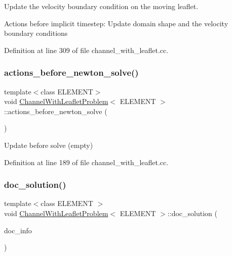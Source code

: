 Update the velocity boundary condition on the moving leaflet. 

Actions before implicit timestep\+: Update domain shape and the velocity boundary conditions 

Definition at line 309 of file channel\+\_\+with\+\_\+leaflet.\+cc.

\mbox{\label{classChannelWithLeafletProblem_a5721dfad66d13a1ae60adce7801dcb12}} 
\subsubsection{\texorpdfstring{actions\+\_\+before\+\_\+newton\+\_\+solve()}{actions\_before\_newton\_solve()}}
{\footnotesize\ttfamily template$<$class E\+L\+E\+M\+E\+NT$>$ \\
void \hyperlink{classChannelWithLeafletProblem}{Channel\+With\+Leaflet\+Problem}$<$ E\+L\+E\+M\+E\+NT $>$\+::actions\+\_\+before\+\_\+newton\+\_\+solve (\begin{DoxyParamCaption}{ }\end{DoxyParamCaption})\hspace{0.3cm}{\ttfamily [inline]}}



Update before solve (empty) 



Definition at line 189 of file channel\+\_\+with\+\_\+leaflet.\+cc.

\mbox{\label{classChannelWithLeafletProblem_adb8e1420844f7b40d71beae81111c4d0}} 
\subsubsection{\texorpdfstring{doc\+\_\+solution()}{doc\_solution()}}
{\footnotesize\ttfamily template$<$class E\+L\+E\+M\+E\+NT $>$ \\
void \hyperlink{classChannelWithLeafletProblem}{Channel\+With\+Leaflet\+Problem}$<$ E\+L\+E\+M\+E\+NT $>$\+::doc\+\_\+solution (\begin{DoxyParamCaption}\item[{Doc\+Info \&}]{doc\+\_\+info }\end{DoxyParamCaption})}



